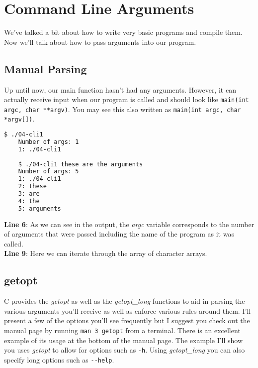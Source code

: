 \documentclass[../main.tex]{subfiles}
\begin{document}
	
	\chapter{Command Line Arguments}
	
	We've talked a bit about how to write very basic programs and compile them.  Now we'll talk about how to pass arguments into our program.  
	
	\section{Manual Parsing}
	Up until now, our main function hasn't had any arguments.  However, it can actually receive input when our program is called and should look like \texttt{main(int argc, char **argv)}.  You may see this also written as \texttt{main(int argc, char *argv[])}.\\

		
	
	\clearpage
	
	\begin{lstlisting}[language=bash, numbers=none]
	$ ./04-cli1 
	Number of args: 1
	1: ./04-cli1
	
	$ ./04-cli1 these are the arguments
	Number of args: 5
	1: ./04-cli1
	2: these
	3: are
	4: the
	5: arguments
	\end{lstlisting}
	
	\textbf{Line 6}: As we can see in the output, the \textit{argc} variable corresponds to the number of arguments that were passed including the name of the program as it was called. \\
	\textbf{Line 9}: Here we can iterate through the array of character arrays.
	
	\section{getopt}
	C provides the \textit{getopt} as well as the \textit{getopt\_long} functions to aid in parsing the various arguments you'll receive as well as enforce various rules around them.  I'll present a few of the options you'll see frequently but I suggest you check out the manual page by running \texttt{man 3 getopt} from a terminal.  There is an excellent example of its usage at the bottom of the manual page. The example I'll show you uses \textit{getopt} to allow for options such as \texttt{-h}.  Using \textit{getopt\_long} you can also specify long options such as \texttt{-{}-help}.  \\
	
\end{document}
